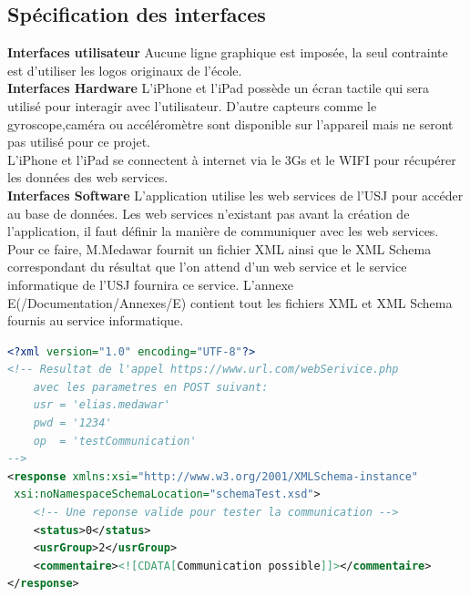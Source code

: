 	\subsection{Spécification des interfaces}
		\textbf{Interfaces utilisateur}  
			Aucune ligne graphique est imposée, la seul contrainte est d'utiliser les logos originaux de l'école.\\[0.2cm]
		\textbf{Interfaces Hardware} 
			L'iPhone et l'iPad possède un écran tactile qui sera utilisé pour interagir avec l'utilisateur. D'autre capteurs comme le gyroscope,caméra ou accéléromètre sont disponible sur l'appareil mais ne seront pas utilisé pour ce projet. \\
			L'iPhone et l'iPad se connectent à internet via le 3Gs et le WIFI pour récupérer les données des web services.\\[0.2cm]
	 	\textbf{Interfaces Software} 
			L'application utilise les web services de l'\gls{USJ} pour accéder au base de données. Les web services n'existant pas avant la création de l'application, il faut définir la manière de communiquer avec les web services. Pour ce faire, M.Medawar fournit un fichier XML ainsi que le XML Schema correspondant du résultat que l'on attend d'un web service et le service informatique de l'USJ fournira ce service.  L'annexe E(/Documentation/Annexes/E) contient tout les fichiers XML et XML Schema fournis au service informatique. \\
			  \begin{lstlisting}[language=XML,caption = Exemple de code XML fournit au service informatique de l'USJ]
<?xml version="1.0" encoding="UTF-8"?>
<!-- Resultat de l'appel https://www.url.com/webSerivice.php 
    avec les parametres en POST suivant:
    usr = 'elias.medawar'
    pwd = '1234'
    op  = 'testCommunication'
-->
<response xmlns:xsi="http://www.w3.org/2001/XMLSchema-instance"
 xsi:noNamespaceSchemaLocation="schemaTest.xsd">
    <!-- Une reponse valide pour tester la communication -->
    <status>0</status>
    <usrGroup>2</usrGroup>
    <commentaire><![CDATA[Communication possible]]></commentaire>
</response>
			\end{lstlisting}

